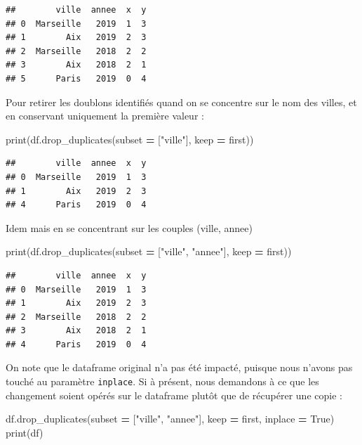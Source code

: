 \documentclass[
  12pt,
]{book}
\newenvironment{Shaded}{\begin{snugshade}}{\end{snugshade}}
\newcommand{\BuiltInTok}[1]{#1}
\newcommand{\NormalTok}[1]{#1}
\newcommand{\OperatorTok}[1]{\textcolor[rgb]{0.81,0.36,0.00}{\textbf{#1}}}
\newcommand{\StringTok}[1]{\textcolor[rgb]{0.31,0.60,0.02}{#1}}
\newcommand{\VariableTok}[1]{\textcolor[rgb]{0.00,0.00,0.00}{#1}}
\numberwithin{equation}{section}
\numberwithin{countremarque}{section}
\begin{document}
\begin{lstlisting}
##        ville  annee  x  y
## 0  Marseille   2019  1  3
## 1        Aix   2019  2  3
## 2  Marseille   2018  2  2
## 3        Aix   2018  2  1
## 5      Paris   2019  0  4
\end{lstlisting}

Pour retirer les doublons identifiés quand on se concentre sur le nom des villes, et en conservant uniquement la première valeur :

\begin{Shaded}
\begin{Highlighting}[]
\BuiltInTok{print}\NormalTok{(df.drop\_duplicates(subset }\OperatorTok{=}\NormalTok{ [}\StringTok{"ville"}\NormalTok{], keep }\OperatorTok{=} \StringTok{\textquotesingle{}first\textquotesingle{}}\NormalTok{))}
\end{Highlighting}
\end{Shaded}

\begin{lstlisting}
##        ville  annee  x  y
## 0  Marseille   2019  1  3
## 1        Aix   2019  2  3
## 4      Paris   2019  0  4
\end{lstlisting}

Idem mais en se concentrant sur les couples (ville, annee)

\begin{Shaded}
\begin{Highlighting}[]
\BuiltInTok{print}\NormalTok{(df.drop\_duplicates(subset }\OperatorTok{=}\NormalTok{ [}\StringTok{"ville"}\NormalTok{, }\StringTok{"annee"}\NormalTok{], keep }\OperatorTok{=} \StringTok{\textquotesingle{}first\textquotesingle{}}\NormalTok{))}
\end{Highlighting}
\end{Shaded}

\begin{lstlisting}
##        ville  annee  x  y
## 0  Marseille   2019  1  3
## 1        Aix   2019  2  3
## 2  Marseille   2018  2  2
## 3        Aix   2018  2  1
## 4      Paris   2019  0  4
\end{lstlisting}

On note que le dataframe original n'a pas été impacté, puisque nous n'avons pas touché au paramètre \texttt{inplace}. Si à présent, nous demandons à ce que les changement soient opérés sur le dataframe plutôt que de récupérer une copie :

\begin{Shaded}
\begin{Highlighting}[]
\NormalTok{df.drop\_duplicates(subset }\OperatorTok{=}\NormalTok{ [}\StringTok{"ville"}\NormalTok{, }\StringTok{"annee"}\NormalTok{], keep }\OperatorTok{=} \StringTok{\textquotesingle{}first\textquotesingle{}}\NormalTok{, inplace }\OperatorTok{=} \VariableTok{True}\NormalTok{)}
\BuiltInTok{print}\NormalTok{(df)}
\end{Highlighting}
\end{Shaded}
\end{document}
